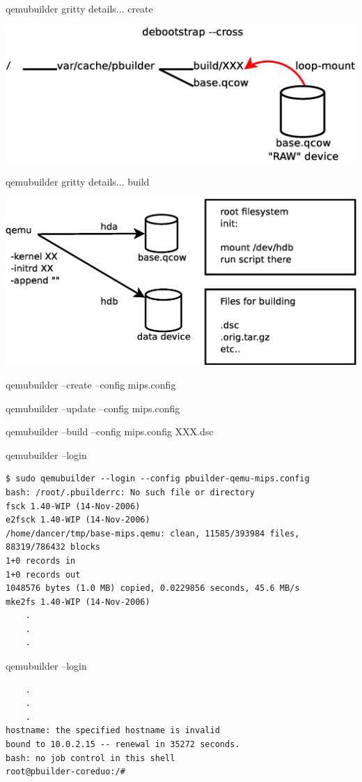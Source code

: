 \documentclass[dvipdfm,17pt,times]{beamer}
\newcommand{\emtext}[1]{
\begin{frame}{}
 
{\Huge #1
}
\end{frame}
}
\begin{document}
\begin{frame}{qemubuilder gritty details... create}

\includegraphics[width=1\hsize]{qemubuilder-create.eps}
\end{frame}

\begin{frame}{qemubuilder gritty details... build}

\includegraphics[width=1\hsize]{qemubuilder-build.eps}
\end{frame}

\emtext{qemubuilder --create --config mips.config}
\emtext{qemubuilder --update --config mips.config}
\emtext{qemubuilder --build --config mips.config XXX.dsc}
\begin{frame}[containsverbatim]{qemubuilder --login}
\begin{verbatim}
$ sudo qemubuilder --login --config pbuilder-qemu-mips.config
bash: /root/.pbuilderrc: No such file or directory
fsck 1.40-WIP (14-Nov-2006)
e2fsck 1.40-WIP (14-Nov-2006)
/home/dancer/tmp/base-mips.qemu: clean, 11585/393984 files, 88319/786432 blocks
1+0 records in
1+0 records out
1048576 bytes (1.0 MB) copied, 0.0229856 seconds, 45.6 MB/s
mke2fs 1.40-WIP (14-Nov-2006)
	.
	.
	.
\end{verbatim}\end{frame}

\begin{frame}[containsverbatim]{qemubuilder --login}
\begin{verbatim}
	.
	.
	.
hostname: the specified hostname is invalid
bound to 10.0.2.15 -- renewal in 35272 seconds.
bash: no job control in this shell
root@pbuilder-coreduo:/#
\end{verbatim}
\end{frame}
\end{document}
